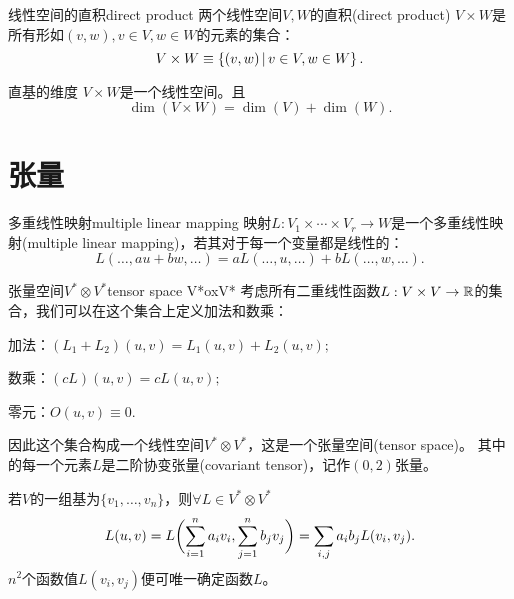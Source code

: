 \begin{definition}{线性空间的直积}{direct product}
	两个线性空间$V,W$的直积(direct product) $V\times W$是所有形如$(v,w),v\in V,w\in W$的元素的集合：
	\begin{equation}
		V\times W\equiv\left\{(v,w)\,\middle\vert\,v\in V,w\in W\right\}.
	\end{equation}
\end{definition}
\begin{theorem}{直基的维度}{}
	$V\times W$是一个线性空间。且
	\begin{equation}
		\dim(V\times W)=\dim(V)+\dim(W).
	\end{equation}
\end{theorem}
\section{张量}
\begin{definition}{多重线性映射}{multiple linear mapping}
	映射$L:V_1\times\cdots\times V_r\to W$是一个多重线性映射(multiple linear mapping)，若其对于每一个变量都是线性的：
	\[
		L(\ldots,au+bw,\ldots)=aL(\ldots,u,\ldots)+bL(\ldots,w,\ldots).
	\]
\end{definition}
\begin{definition}{张量空间$V^\ast\otimes V^\ast$}{tensor space V*oxV*}
	考虑所有二重线性函数$L:V\times V\to\mathbb R$的集合，我们可以在这个集合上定义加法和数乘：
	\begin{compactitem}
		\item 加法：$(L_1+L_2)(u,v)=L_1(u,v)+L_2(u,v);$
		\item 数乘：$(cL)(u,v)=cL(u,v);$
		\item 零元：$O(u,v)\equiv 0.$
	\end{compactitem}
	因此这个集合构成一个线性空间$V^\ast\otimes V^\ast$，这是一个张量空间(tensor space)。
	其中的每一个元素$L$是二阶协变张量(covariant tensor)，记作$(0,2)$张量。
\end{definition}
若$V$的一组基为$\{v_1,\ldots,v_n\}$，则$\forall L\in V^\ast\otimes V^\ast$ 
\[
	L(u,v)=L\biggl(\sum_{i=1}^na_iv_i,\sum_{j=1}^nb_jv_j\biggr)=\sum_{i,j}a_ib_jL(v_i,v_j).
\]
$n^2$个函数值$L(v_i,v_j)$便可唯一确定函数$L$。

